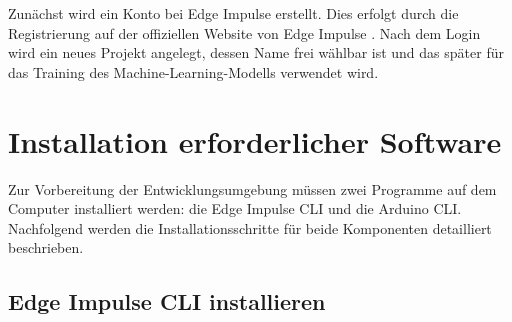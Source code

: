 Zunächst wird ein Konto bei Edge Impulse erstellt. Dies erfolgt durch die Registrierung auf der offiziellen Website von Edge Impulse . Nach dem Login wird ein neues Projekt angelegt, dessen Name frei wählbar ist und das später für das Training des Machine-Learning-Modells verwendet wird.

\section{Installation erforderlicher Software}

Zur Vorbereitung der Entwicklungsumgebung müssen zwei Programme auf dem Computer installiert werden: die Edge Impulse CLI und die Arduino CLI. Nachfolgend werden die Installationsschritte für beide Komponenten detailliert beschrieben.

\subsection{Edge Impulse CLI installieren}

